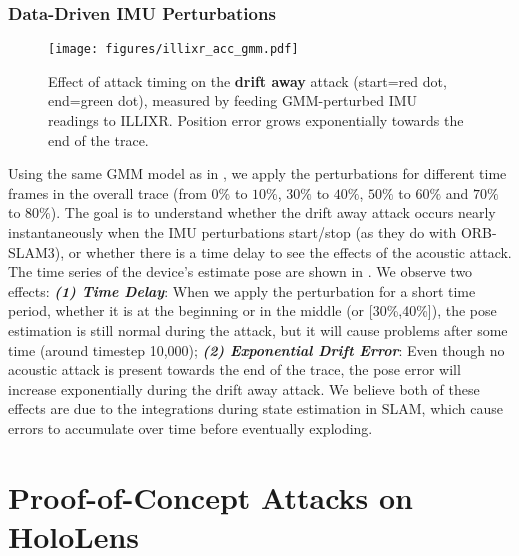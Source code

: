 \subsubsection{Data-Driven IMU Perturbations} 
\begin{figure}[h]
    \centering
    \texttt{[image: figures/illixr\_acc\_gmm.pdf]}
    \caption{Effect of attack timing on the \textbf{drift away} attack (start=red dot, end=green dot), measured by feeding GMM-perturbed IMU readings to ILLIXR. Position error grows exponentially towards the end of the trace. %
    }
    \label{fig:illixr_acc_gmm}
\end{figure}
Using the same GMM model as in  , we apply the perturbations for different time frames in the overall trace (from $0\%$ to $10\%$, $30\%$ to $40\%$, $50\%$ to $60\%$ and $70\%$ to $80\%$). 
The goal is to understand whether the drift away attack occurs nearly instantaneously when the IMU perturbations start/stop (as they do with ORB-SLAM3), or whether there is a time delay to see the effects of the acoustic attack.
The time series of the device's estimate pose are shown in .
We observe two effects: \emph{\textbf{(1) Time Delay}}: When we apply the perturbation for a short time period, whether it is at the beginning or in the middle (\eg [0\%,10\%] or [30\%,40\%]), the pose estimation is still normal during the attack, but it will cause problems after some time (\eg around timestep 10,000); \emph{\textbf{(2) Exponential Drift Error}}: Even though no acoustic attack is present towards the end of the trace, the pose error will increase exponentially during the drift away attack. %
We believe both of these effects are due to the integrations during state estimation in SLAM, which cause errors to accumulate over time before eventually exploding.



\section{Proof-of-Concept Attacks on HoloLens}
\label{sec:exp-hololens2}

